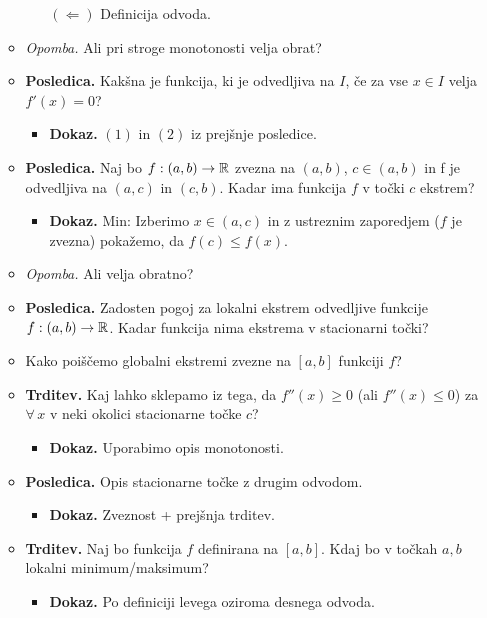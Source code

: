 \begin{enumerate}
\begin{itemize}
\begin{itemize}
            $(\Leftarrow)$ Definicija odvoda.
        \end{itemize}
        \item \colorbox{yellow!30}{\emph{Opomba.}} Ali pri stroge monotonosti velja obrat?
        \item \colorbox{orange!30}{\textbf{Posledica.}} Kakšna je funkcija, ki je odvedljiva na $I$, če za vse $x \in I$ velja $f'(x)=0$?
        \begin{itemize}
            \item \colorbox{green!30}{\textbf{Dokaz.}} $(1)$ in $(2)$ iz prejšnje posledice.
        \end{itemize}
        \item \colorbox{orange!30}{\textbf{Posledica.}} Naj bo $f: (a,b) \to \mathbb{R}$ zvezna na $(a,b)$, $c \in (a,b)$ in f je odvedljiva na $(a,c)$ in $(c,b)$. Kadar ima funkcija $f$ v točki $c$ ekstrem?
        \begin{itemize}
            \item \colorbox{green!30}{\textbf{Dokaz.}} Min: Izberimo $x \in (a, c)$ in z ustreznim zaporedjem ($f$ je zvezna) pokažemo, da $f(c) \leq f(x)$.
        \end{itemize}
        \item \colorbox{yellow!30}{\emph{Opomba.}} Ali velja obratno?
        \item \colorbox{orange!30}{\textbf{Posledica.}} Zadosten pogoj za lokalni ekstrem odvedljive funkcije $f: (a,b) \to \mathbb{R}$. Kadar funkcija nima ekstrema v stacionarni točki?
        \item Kako poiščemo globalni ekstremi zvezne na $[a,b]$ funkciji $f$?
        \item \colorbox{blue!30}{\textbf{Trditev.}} Kaj lahko sklepamo iz tega, da $f''(x) \geq 0$ (ali $f''(x) \leq 0$) za $\forall \, x$ v neki okolici stacionarne točke $c$?
        \begin{itemize}
            \item \colorbox{green!30}{\textbf{Dokaz.}} Uporabimo opis monotonosti.
        \end{itemize}
        \item \colorbox{orange!30}{\textbf{Posledica.}} Opis stacionarne točke z drugim odvodom.
        \begin{itemize}
            \item \colorbox{green!30}{\textbf{Dokaz.}} Zveznost + prejšnja trditev.
        \end{itemize}
        \item \colorbox{blue!30}{\textbf{Trditev.}} Naj bo funkcija $f$ definirana na $[a,b]$. Kdaj bo v točkah $a,b$ lokalni minimum/maksimum? 
        \begin{itemize}
            \item \colorbox{green!30}{\textbf{Dokaz.}} Po definiciji levega oziroma desnega odvoda.
        \end{itemize}
    \end{itemize}


\end{enumerate}
